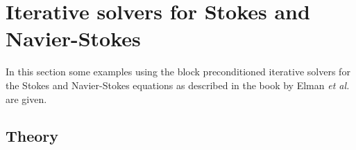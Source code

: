 
\def\headdate{15th June 2009}

\section{Iterative solvers for Stokes and Navier-Stokes}
\label{sec:iterativestokes}

In this section some examples using the block preconditioned iterative solvers
for the Stokes and Navier-Stokes equations as described in the book
by Elman \emph{et al.} \cite{Elman05} are given.

\subsection{Theory}

